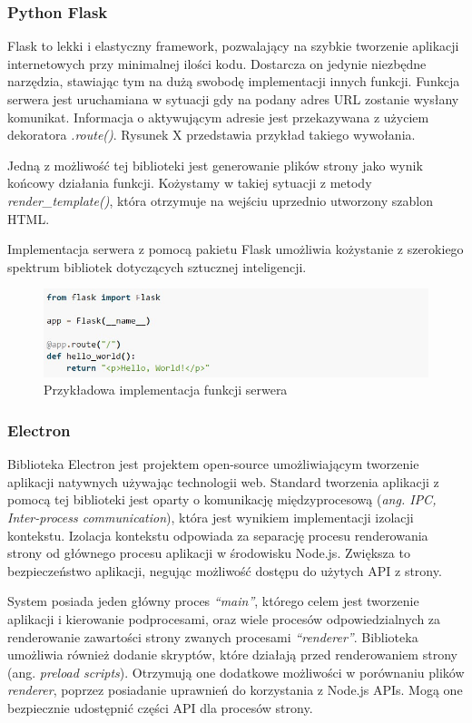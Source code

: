 \documentclass[12pt,a4paper,twoside]{article}
\begin{document}
\subsubsection{Python Flask}
Flask to lekki i elastyczny framework, pozwalający na szybkie tworzenie aplikacji internetowych przy minimalnej ilości kodu. Dostarcza on jedynie niezbędne narzędzia, stawiając tym na dużą swobodę implementacji innych funkcji. 
Funkcja serwera jest uruchamiana w sytuacji gdy na podany adres URL zostanie wysłany komunikat. Informacja o aktywującym adresie jest przekazywana z użyciem dekoratora \textit{.route()}. Rysunek X przedstawia przykład takiego wywołania.\par
Jedną z możliwość tej biblioteki jest generowanie plików strony jako wynik końcowy działania funkcji. Kożystamy w takiej sytuacji z metody \textit{render\_template()}, która otrzymuje na wejściu uprzednio utworzony szablon HTML.\par 
Implementacja serwera z pomocą pakietu Flask umożliwia kożystanie z szerokiego spektrum bibliotek dotyczących sztucznej inteligencji.
\begin{figure}[h!]
\centering
  \includegraphics[width=\textwidth]{img/flask.jpg}
  \caption{Przykładowa implementacja funkcji serwera}
\end{figure}
\subsubsection{Electron}
Biblioteka Electron jest projektem open-source umożliwiającym tworzenie aplikacji natywnych używając technologii web. Standard tworzenia aplikacji z pomocą tej biblioteki jest oparty o komunikację międzyprocesową (\textit{ang. IPC, Inter-process communication}), która jest wynikiem implementacji izolacji kontekstu. Izolacja kontekstu odpowiada za separację procesu renderowania strony od głównego procesu aplikacji w środowisku Node.js. Zwiększa to bezpieczeństwo aplikacji, negując możliwość dostępu do użytych API z strony. \par
System posiada jeden główny proces \textit{``main''}, którego celem jest tworzenie aplikacji i kierowanie podprocesami, oraz wiele procesów odpowiedzialnych za renderowanie zawartości strony zwanych procesami \textit{``renderer''}. Biblioteka umożliwia również dodanie skryptów, które działają przed renderowaniem strony (ang. \textit{preload scripts}). Otrzymują one dodatkowe możliwości w porównaniu plików \textit{renderer}, poprzez posiadanie uprawnień do korzystania z Node.js APIs. Mogą one bezpiecznie udostępnić części API dla procesów strony.
\end{document}
